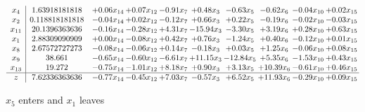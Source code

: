 \documentclass[9pt]{article}
\begin{document}
 \[\begin{array}{c| c c@{\hskip 2pt} c@{\hskip 2pt} c@{\hskip 2pt} c@{\hskip 2pt} c@{\hskip 2pt} c@{\hskip 2pt} c@{\hskip 2pt} c@{\hskip 2pt} }
 x_{4}   &  1.63918181818 & +  0.06 x_{14} & +  0.07 x_{12} & -0.91 x_{7} & +  0.48 x_{3} & -0.63 x_{5} & -0.62 x_{6} & -0.04 x_{10} & +  0.02 x_{15}\\
 x_{2}   &  0.118818181818 & -0.04 x_{14} & +  0.02 x_{12} & -0.12 x_{7} & +  0.66 x_{3} & +  0.22 x_{5} & -0.19 x_{6} & -0.02 x_{10} & -0.03 x_{15}\\
 x_{11}   &  20.1396363636 & -0.16 x_{14} & -0.28 x_{12} & +  4.31 x_{7} & -15.94 x_{3} & -3.30 x_{5} & +  3.19 x_{6} & +  0.28 x_{10} & +  0.63 x_{15}\\
 x_{1}   &  2.88309090909 & +  0.00 x_{14} & -0.08 x_{12} & +  0.42 x_{7} & +  0.76 x_{3} & -1.24 x_{5} & +  0.40 x_{6} & -0.12 x_{10} & +  0.01 x_{15}\\
 x_{8}   &  2.67572727273 & -0.08 x_{14} & -0.06 x_{12} & +  0.14 x_{7} & -0.18 x_{3} & +  0.03 x_{5} & +  1.25 x_{6} & -0.06 x_{10} & +  0.08 x_{15}\\
 x_{9}   &  38.661 & -0.65 x_{14} & -0.60 x_{12} & -6.61 x_{7} & + 11.15 x_{3} & -12.84 x_{5} & +  5.35 x_{6} & -1.53 x_{10} & +  0.43 x_{15}\\
 x_{13}   &  19.272 & -0.75 x_{14} & -1.01 x_{12} & +  8.18 x_{7} & +  0.90 x_{3} & +  3.13 x_{5} & + 10.39 x_{6} & -0.61 x_{10} & +  0.46 x_{15}\\
\hline
z    &  7.62336363636 & -0.77 x_{14} & -0.45 x_{12} & +  7.03 x_{7} & -0.57 x_{3} & +  6.52 x_{5} & + 11.93 x_{6} & -0.29 x_{10} & +  0.09 x_{15}\\
\end{array}\]


 $ x_{5} $ enters and $ x_{1} $ leaves 
\end{document}
